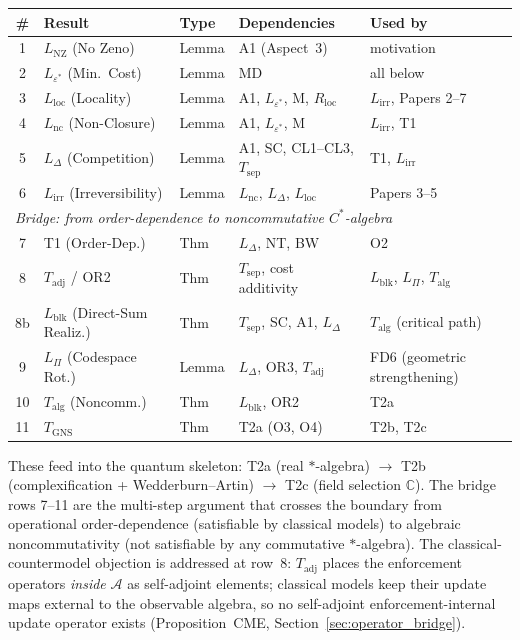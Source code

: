\documentclass[11pt]{article}
\theoremstyle{remark}
\begin{document}
\begin{center}
\smallskip
\footnotesize
\setlength{\tabcolsep}{3pt}
\begin{tabular}{@{}cp{2.6cm}p{1.2cm}p{4.0cm}p{3.0cm}@{}}
\toprule
\textbf{\#} & \textbf{Result} & \textbf{Type} & \textbf{Dependencies} & \textbf{Used by} \\
\midrule
1 & $L_{\mathrm{NZ}}$ (No Zeno) & Lemma & A1 (Aspect~3) & motivation \\
2 & $L_{\varepsilon^*}$ (Min.\ Cost) & Lemma & MD & all below \\
3 & $L_{\mathrm{loc}}$ (Locality) & Lemma & A1, $L_{\varepsilon^*}$, M, $R_{\mathrm{loc}}$ & $L_{\mathrm{irr}}$, Papers 2--7 \\
4 & $L_{\mathrm{nc}}$ (Non-Closure) & Lemma & A1, $L_{\varepsilon^*}$, M & $L_{\mathrm{irr}}$, T1 \\
5 & $L_{\Delta}$ (Competition) & Lemma & A1, SC, CL1--CL3, $T_{\mathrm{sep}}$ & T1, $L_{\mathrm{irr}}$ \\
6 & $L_{\mathrm{irr}}$ (Irreversibility) & Lemma & $L_{\mathrm{nc}}$, $L_\Delta$, $L_{\mathrm{loc}}$ & Papers 3--5 \\
\midrule
\multicolumn{5}{l}{\textit{Bridge: from order-dependence to noncommutative $C^*$-algebra}} \\
\midrule
7 & T1 (Order-Dep.) & Thm & $L_\Delta$, NT, BW & O2 \\
8 & $T_{\mathrm{adj}}$ / OR2 & Thm & $T_{\mathrm{sep}}$, cost additivity & $L_{\mathrm{blk}}$, $L_\Pi$, $T_{\mathrm{alg}}$ \\
8b & $L_{\mathrm{blk}}$ (Direct-Sum Realiz.) & Thm & $T_{\mathrm{sep}}$, SC, A1, $L_\Delta$ & $T_{\mathrm{alg}}$ (critical path) \\
9 & $L_\Pi$ (Codespace Rot.) & Lemma & $L_\Delta$, OR3, $T_{\mathrm{adj}}$ & FD6 (geometric strengthening) \\
10 & $T_{\mathrm{alg}}$ (Noncomm.) & Thm & $L_{\mathrm{blk}}$, OR2 & T2a \\
11 & $T_{\mathrm{GNS}}$ & Thm & T2a (O3, O4) & T2b, T2c \\
\bottomrule
\end{tabular}
\label{tab:deriv_order}
\end{center}

These feed into the quantum skeleton: T2a (real $*$-algebra) $\to$ T2b (complexification + Wedderburn--Artin) $\to$ T2c (field selection $\mathbb{C}$).  The bridge rows 7--11 are the multi-step argument that crosses the boundary from operational order-dependence (satisfiable by classical models) to algebraic noncommutativity (not satisfiable by any commutative $*$-algebra).  The classical-countermodel objection is addressed at row~8: $T_{\mathrm{adj}}$ places the enforcement operators \emph{inside} $\mathcal{A}$ as self-adjoint elements; classical models keep their update maps external to the observable algebra, so no self-adjoint enforcement-internal update operator exists (Proposition~CME, Section~\ref{sec:operator_bridge}).
\end{document}
